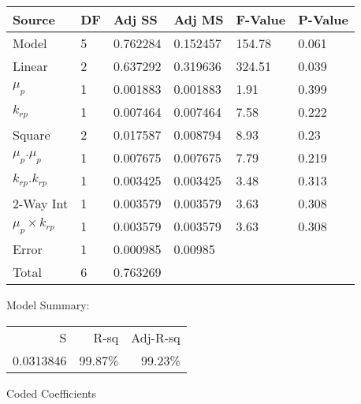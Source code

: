 \documentclass[12pt,a4paper]{article}
\begin{document}
\begin{table}[h]
\centering
\label{my-label}
\begin{tabularx}{\textwidth}{@{}XXXXXX@{}}
\toprule
Source                 & DF & Adj SS   & Adj MS   & F-Value & P-Value \\ \midrule
Model                  & 5  & 0.762284 & 0.152457 & 154.78  & 0.061   \\
\hspace*{0.5cm}Linear                 & 2  & 0.637292 & 0.319636 & 324.51  & 0.039   \\
\hspace*{1cm}$\mu_p$                & 1  & 0.001883 & 0.001883 & 1.91    & 0.399   \\
\hspace*{1cm}$k_{rp}$               & 1  & 0.007464 & 0.007464 & 7.58    & 0.222   \\
\hspace*{0.5cm}Square                 & 2  & 0.017587 & 0.008794 & 8.93    & 0.23    \\
\hspace*{1cm}$\mu_p.\mu_p$   & 1  & 0.007675 & 0.007675 & 7.79    & 0.219   \\
\hspace*{1cm}$k_{rp}.k_{rp}$ & 1  & 0.003425 & 0.003425 & 3.48    & 0.313   \\
\hspace*{0.5cm}2-Way Int      & 1  & 0.003579 & 0.003579 & 3.63    & 0.308   \\
\hspace*{1cm}$\mu_p\times{k_{rp}}$  & 1  & 0.003579 & 0.003579 & 3.63    & 0.308   \\
Error                  & 1  & 0.000985 & 0.00985  &         &         \\
Total                  & 6  & 0.763269   &          &         &         \\ \bottomrule
\end{tabularx}
\end{table}
\noindent
Model Summary:
\begin{table}[h]
\begin{flushleft}
\label{my-label}
\begin{tabular}{rrr}
S         & R-sq    & Adj-R-sq \\
0.0313846 & 99.87\% & 99.23\%
\end{tabular}
\end{flushleft}
\end{table}
\newpage
\noindent
Coded Coefficients
\end{document}
